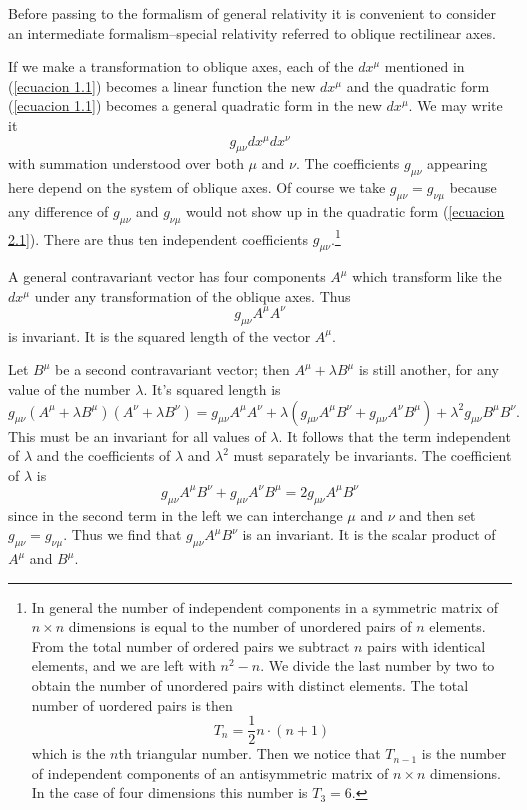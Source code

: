 Before passing to the formalism of general relativity it is convenient to consider an intermediate formalism--special relativity referred to oblique rectilinear axes.

If we make a transformation to oblique axes, each of the $dx^\mu$ mentioned in (\ref{ecuacion 1.1}) becomes a linear function the new $dx^\mu$ and the quadratic form (\ref{ecuacion 1.1}) becomes a general quadratic form in the new $dx^\mu$. We may write it
\begin{equation}
 \label{ecuacion 2.1}
 g_{\mu\nu} dx^\mu dx^\nu
\end{equation}
with summation understood over both $\mu$ and $\nu$. The coefficients $g_{\mu\nu}$ appearing here depend on the system of oblique axes. Of course we take $g_{\mu\nu} = g_{\nu\mu}$ because any difference of $g_{\mu\nu}$ and $g_{\nu\mu}$ would not show up in the quadratic form (\ref{ecuacion 2.1}). There are thus ten independent coefficients $g_{\mu\nu}$.\footnote{In general the number of independent components in a symmetric matrix of $n\times n$ dimensions is equal to the number of unordered pairs of $n$ elements. From the total number of ordered pairs we subtract $n$ pairs with identical elements, and we are left with $n^2 - n$. We divide the last number by two to obtain the number of unordered pairs with distinct elements. The total number of uordered pairs is then \[ T_n = \frac{1}{2} n \cdot (n+1)\] which is the $n$th triangular number. Then we notice that $T_{n-1}$ is the number of independent components of an antisymmetric matrix of $n\times n $ dimensions. In the case of four dimensions this number is $T_3 = 6$.}

A general contravariant vector has four components $A^\mu$ which transform like the $dx^\mu$ under any transformation of the oblique axes. Thus 
\[
 g_{\mu\nu} A^\mu A^\nu
\]
is invariant. It is the squared length of the vector $A^\mu$. 

Let $B^\mu$ be a second contravariant vector; then $A^\mu + \lambda B^\mu$ is still another, for any value of the number $\lambda$. It's squared length is
\[
 g_{\mu\nu}
 \left( A^\mu + \lambda B^\mu \right)
 \left( A^\nu + \lambda B^\nu \right)
 = g_{\mu\nu} A^\mu A^\nu 
 + \lambda \left( g_{\mu\nu} A^\mu B^\nu + g_{\mu\nu} A^\nu B^\mu \right)
 + \lambda^2 g_{\mu\nu} B^\mu B^\nu .
\]
This must be an invariant for all values of $\lambda$. It follows that the term independent of $\lambda$ and the coefficients of $\lambda$ and $\lambda^2$ must separately be invariants. The coefficient of $\lambda$ is
\[
 g_{\mu\nu} A^\mu B^\nu + g_{\mu\nu} A^\nu B^\mu = 2 g_{\mu\nu} A^\mu B^\nu
\]
since in the second term in the left we can interchange $\mu$ and $\nu$ and then set $g_{\mu\nu} = g_{\nu\mu}$. Thus we find that $g_{\mu\nu} A^\mu B^\nu$ is an invariant. It is the scalar product of $A^\mu$ and $B^\mu$.

